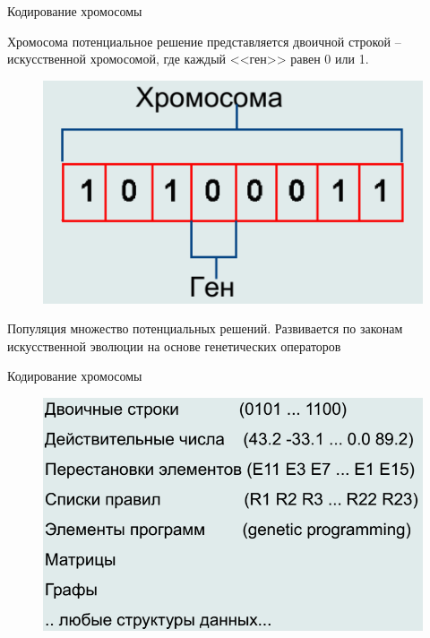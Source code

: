 \documentclass{beamer}
\begin{document}
\begin{frame}{Кодирование хромосомы}
\begin{block}{Хромосома}
потенциальное решение представляется двоичной строкой – искусственной хромосомой, где каждый <<ген>> равен 0 или 1.
\end{block}
\begin{figure}[h]
\centering
\includegraphics[scale=0.4]{images/lec04-pic05.png}
\end{figure}
\begin{block}{Популяция}
множество потенциальных решений. Развивается по законам искусственной эволюции
на основе генетических операторов
\end{block}
\end{frame}

\begin{frame}{Кодирование хромосомы}
\begin{figure}[h]
\centering
\includegraphics[scale=0.5]{images/lec04-pic06.png}
\end{figure}
\end{frame}
\end{document}
